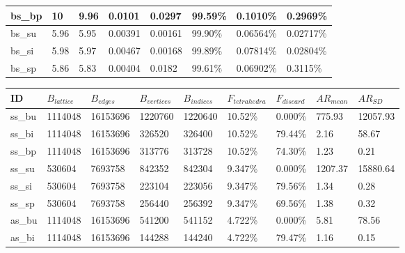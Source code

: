 \documentclass[]{article}
\begin{document}
\begin{table}[htb]
\begin{tabular}{|l|l|l|l|l|l|l|l|}
bs\_bp & 10          & 9.96           & 0.0101       & 0.0297         & 99.59\%        & 0.1010\%     & 0.2969\%       \\ \hline
bs\_su & 5.96        & 5.95           & 0.00391      & 0.00161        & 99.90\%        & 0.06564\%    & 0.02717\%      \\ \hline
bs\_si & 5.98        & 5.97           & 0.00467      & 0.00168        & 99.89\%        & 0.07814\%    & 0.02804\%      \\ \hline
bs\_sp & 5.86        & 5.83           & 0.00404      & 0.0182         & 99.61\%        & 0.06902\%    & 0.3115\%       \\ \hline
\end{tabular}
\end{table}

\begin{table}[htb]
\centering
\begin{tabular}{|l|l|l|l|l|l|l|l|l|}
\hline
ID     & $B_{lattice}$ & $B_{edges}$ & $B_{vertices}$ & $B_{indices}$ & $F_{tetrahedra}$ & $F_{discard}$ & $AR_{mean}$ & $AR_{SD}$ \\ \hline
ss\_bu & 1114048             & 16153696    & 1220760        & 1220640       & 10.52\%          & 0.000\%         & 775.93      & 12057.93  \\ \hline
ss\_bi & 1114048             & 16153696    & 326520         & 326400        & 10.52\%          & 79.44\%         & 2.16        & 58.67     \\ \hline
ss\_bp & 1114048             & 16153696    & 313776         & 313728        & 10.52\%          & 74.30\%         & 1.23        & 0.21      \\ \hline
ss\_su & 530604              & 7693758     & 842352         & 842304        & 9.347\%          & 0.000\%         & 1207.37     & 15880.64  \\ \hline
ss\_si & 530604              & 7693758     & 223104         & 223056        & 9.347\%          & 79.56\%         & 1.34        & 0.28      \\ \hline
ss\_sp & 530604              & 7693758     & 256440         & 256392        & 9.347\%          & 69.56\%         & 1.38        & 0.32      \\ \hline
as\_bu & 1114048             & 16153696    & 541200         & 541152        & 4.722\%          & 0.000\%         & 5.81        & 78.56     \\ \hline
as\_bi & 1114048             & 16153696    & 144288         & 144240        & 4.722\%          & 79.47\%         & 1.16        & 0.15      \\ \hline

\end{tabular}
\end{table}
\end{document}
